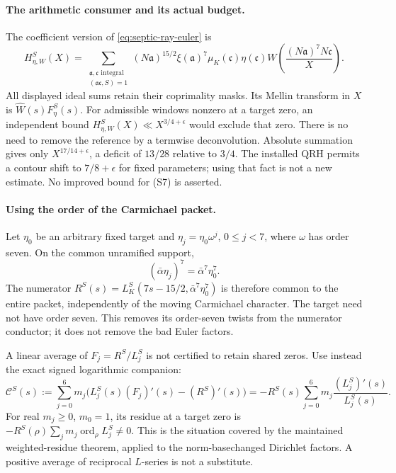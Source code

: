 \documentclass[11pt]{article}
\begin{document}
\paragraph{The arithmetic consumer and its actual budget.}
The coefficient version of \eqref{eq:septic-ray-euler} is
\[
 H_{\eta,W}^S(X)=
 \sum_{\substack{\mathfrak a,\mathfrak c\text{ integral}\\
                  (\mathfrak a\mathfrak c,S)=1}}
 (N\mathfrak a)^{15/2}\xi(\mathfrak a)^7
 \mu_K(\mathfrak c)\eta(\mathfrak c)
 W\!\left(\frac{(N\mathfrak a)^7N\mathfrak c}{X}\right).
 \tag{S7}\label{eq:septic-ray-sum}
\]
All displayed ideal sums retain their coprimality masks.
Its Mellin transform in \(X\) is
\(\widehat W(s)F_\eta^S(s)\).
For admissible windows nonzero at a target zero, an independent
bound \(H_{\eta,W}^S(X)\ll X^{3/4+\epsilon}\) would exclude that
zero. There is no need to remove the reference by a termwise
deconvolution. Absolute summation gives only
\(X^{17/14+\epsilon}\), a deficit of \(13/28\) relative to \(3/4\).
The installed QRH permits a contour shift to \(7/8+\epsilon\)
for fixed parameters; using that fact is not a new estimate.
No improved bound for (S7) is asserted.

\paragraph{Using the order of the Carmichael packet.}
Let \(\eta_0\) be an arbitrary fixed target and
\(\eta_j=\eta_0\omega^j\), \(0\le j<7\), where \(\omega\) has order
seven. On the common unramified support,
\[
 (\bar\alpha\eta_j)^7=\bar\alpha^7\eta_0^7.
\]
The numerator \(R^S(s)=L_K^S(7s-15/2,\bar\alpha^7\eta_0^7)\)
is therefore common to the entire packet, independently of the
moving Carmichael character. The target need not have order seven.
This removes its order-seven twists from the numerator conductor;
it does not remove the bad Euler factors.

A linear average of \(F_j=R^S/L_j^S\) is not certified to retain
shared zeros. Use instead the exact signed logarithmic companion:
\[
 \mathcal C^S(s):=\sum_{j=0}^6m_j
    \bigl(L_j^S(s)(F_j)'(s)-(R^S)'(s)\bigr)
       =-R^S(s)\sum_{j=0}^6m_j\frac{(L_j^S)'(s)}{L_j^S(s)}.
 \tag{S8}\label{eq:septic-signed-companion}
\]
For real \(m_j\ge0\), \(m_0=1\), its residue at a target zero is
\(-R^S(\rho)\sum_jm_j\operatorname{ord}_\rho L_j^S\ne0\).
This is the situation covered by the maintained weighted-residue
theorem, applied to the norm-basechanged Dirichlet factors.
A positive average of reciprocal \(L\)-series is not a substitute.
\end{document}
